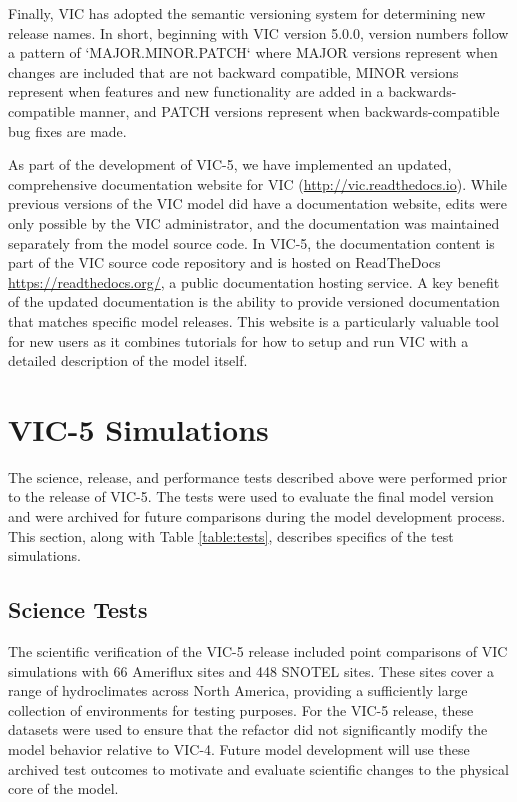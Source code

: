 \documentclass[gmd, manuscript]{copernicus}
\begin{document}
    Finally, VIC has adopted the semantic versioning system \citep{Preston-Werner_2018} for determining new release names. In short, beginning with VIC version 5.0.0, version numbers follow a pattern of `MAJOR.MINOR.PATCH` where MAJOR versions represent when changes are included that are not backward compatible, MINOR versions represent when features and new functionality are added in a backwards-compatible manner, and PATCH versions represent when backwards-compatible bug fixes are made.

    As part of the development of VIC-5, we have implemented an updated, comprehensive documentation website for VIC (\url{http://vic.readthedocs.io}). While previous versions of the VIC model did have a documentation website, edits were only possible by the VIC administrator, and the documentation was maintained separately from the model source code. In VIC-5, the documentation content is part of the VIC source code repository and is hosted on ReadTheDocs \url{https://readthedocs.org/}, a public documentation hosting service. A key benefit of the updated documentation is the ability to provide versioned documentation that matches specific model releases. This website is a particularly valuable tool for new users as it combines tutorials for how to setup and run VIC with a detailed description of the model itself.


  \section{VIC-5 Simulations}
    \label{sec:vic-5_simulations}

    The science, release, and performance tests described above were performed prior to the release of VIC-5. The tests were used to evaluate the final model version and were archived for future comparisons during the model development process. This section, along with Table \ref{table:tests}, describes specifics of the test simulations.

    \subsection{Science Tests}
    \label{sec:science_sims}

    The scientific verification of the VIC-5 release included point comparisons of VIC simulations with 66 Ameriflux sites \citep{Baldocchi_1996,Baldocchi_2001,Bohn_2016} and 448 SNOTEL sites. These sites cover a range of hydroclimates across North America, providing a sufficiently large collection of environments for testing purposes. For the VIC-5 release, these datasets were used to ensure that the refactor did not significantly modify the model behavior relative to VIC-4. Future model development will use these archived test outcomes to motivate and evaluate scientific changes to the physical core of the model.
\end{document}
